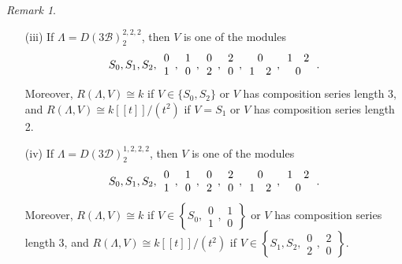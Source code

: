 \documentclass{amsart}
\theoremstyle{plain}
\theoremstyle{definition}
\theoremstyle{remark}
\newtheorem{rem}[thm]{Remark}
\begin{document}
\begin{rem}
\begin{enumerate}
\item[(iii)] If $\Lambda=D(3\mathcal{B})_2^{2,2,2}$, then $V$ is one of the modules
$$S_0,S_1,S_2,\begin{array}{c}0\\1\end{array},\begin{array}{c}1\\0\end{array}, \begin{array}{c}0\\2\end{array}, \begin{array}{c}2\\0\end{array},
\begin{array}{cc}\multicolumn{2}{c}{0}\\1&2\end{array}, \begin{array}{cc}1&2\\ \multicolumn{2}{c}{0}\end{array}\,.$$
Moreover, $R(\Lambda,V)\cong k$ if $V\in\{S_0,S_2\}$ or $V$ has composition series length 3, and
$R(\Lambda,V)\cong k[[t]]/(t^2)$ if $V=S_1$ or $V$ has composition series length 2.

\item[(iv)] If $\Lambda=D(3\mathcal{D})_2^{1,2,2,2}$, then $V$ is one of the modules
$$S_0,S_1,S_2,\begin{array}{c}0\\1\end{array},\begin{array}{c}1\\0\end{array}, \begin{array}{c}0\\2\end{array}, \begin{array}{c}2\\0\end{array},
\begin{array}{cc}\multicolumn{2}{c}{0}\\1&2\end{array}, \begin{array}{cc}1&2\\ \multicolumn{2}{c}{0}\end{array}\,.$$
Moreover, $R(\Lambda,V)\cong k$ if $V\in\left\{S_0,\begin{array}{c}0\\1\end{array},\begin{array}{c}1\\0\end{array}\right\}$ or $V$ has 
composition series length 3, and
$R(\Lambda,V)\cong k[[t]]/(t^2)$ if $V\in\left\{S_1,S_2,\begin{array}{c}0\\2\end{array},\begin{array}{c}2\\0\end{array}\right\}$.
\end{enumerate}
\end{rem}
\end{document}
